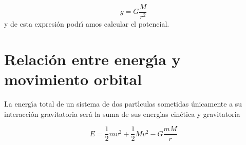 \begin{equation}
g=G\frac{M}{r^2}
\label{eq:modulo_campo_esfera}
\end{equation}
y de esta expresi\'on podr\'\i{} amos calcular el potencial.




\section{Relaci\'on entre energ\'\i{}a y movimiento orbital}

La energ\'\i{}a total de un sistema de dos part\'\i{}culas sometidas \'unicamente a su interacci\'on gravitatoria ser\'a la suma de sus energ\'\i{}as cin\'etica y gravitatoria

\begin{equation}
E=\frac{1}{2}mv^2+\frac{1}{2}Mv^2-G\frac{mM}{r}
\label{eq:energia_total_gravitatoria_2p}
\end{equation}

